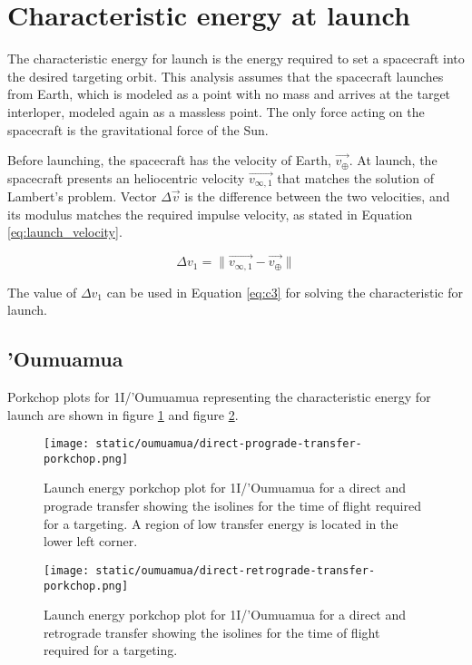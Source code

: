 \section{Characteristic energy at launch}

The characteristic energy for launch is the energy required to set a spacecraft
into the desired targeting orbit. This analysis assumes that the spacecraft
launches from Earth, which is modeled as a point with no mass and arrives at the
target interloper, modeled again as a massless point. The only force acting on
the spacecraft is the gravitational force of the Sun.

Before launching, the spacecraft has the velocity of Earth, $\vec{v_{\oplus}}$.
At launch, the spacecraft presents an heliocentric velocity $\vec{v_{\infty
        ,1}}$ that matches the solution of Lambert's problem. Vector $\Delta{\vec{v}}$
is the difference between the two velocities, and its modulus matches the
required impulse velocity, as stated in Equation \ref{eq:launch_velocity}.

\begin{equation}
  \Delta v_1 = \|\vec{v_{\infty ,1}} - \vec{v_{\oplus}}\|
  \label{eq:launch_velocity}
\end{equation}

The value of $\Delta v_1$ can be used in Equation \ref{eq:c3} for solving the
characteristic for launch.

\subsection{'Oumuamua}

Porkchop plots for 1I/'Oumuamua representing the characteristic energy for launch
are shown in figure \ref{fig:oumuamua-direct-prograde-transfer-porkchop} and
figure \ref{fig:oumuamua-direct-retrograde-transfer-porkchop}.

\begin{figure}[H]
  \centering
  \texttt{[image: static/oumuamua/direct-prograde-transfer-porkchop.png]}
  \caption[Direct and prograde launch energy porkchop for 'Oumuamua]{Launch energy porkchop plot for 1I/'Oumuamua for a direct and prograde
    transfer showing the isolines for
    the time of flight required for a targeting. A region of low transfer
    energy is located in the lower left corner.}
  \label{fig:oumuamua-direct-prograde-transfer-porkchop}
\end{figure}

\begin{figure}[H]
  \centering
  \texttt{[image: static/oumuamua/direct-retrograde-transfer-porkchop.png]}
  \caption[Direct and retrograde launch energy porkchop for
    'Oumuamua]{Launch energy porkchop plot for 1I/'Oumuamua for a direct and
    retrograde transfer showing the isolines for
    the time of flight required for a targeting.}
  \label{fig:oumuamua-direct-retrograde-transfer-porkchop}
\end{figure}


